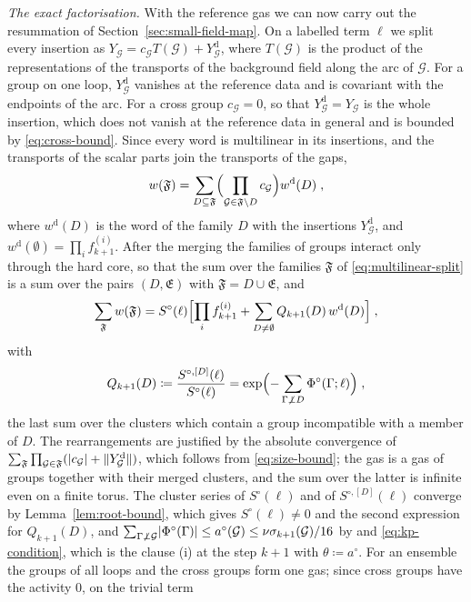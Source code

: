 \documentclass[11pt]{preprint}
\DeclarePairedDelimiter{\abs}{\lvert}{\rvert}
\DeclarePairedDelimiter{\norm}{\lVert}{\rVert}
\numberwithin{equation}{section}
\theoremstyle{definition}
\theoremstyle{remark}
\theoremstyle{plain}
\begin{document}
\emph{The exact factorisation.} With the reference gas we can now carry out the resummation of Section~\ref{sec:small-field-map}. On a labelled term $\ell$ we split every insertion as $Y_{\mathcal G} = c_{\mathcal G}T(\mathcal G) + Y^{\mathrm d}_{\mathcal G}$, where $T(\mathcal G)$ is the product of the representations of the transports of the background field along the arc of $\mathcal G$. For a group on one loop, $Y^{\mathrm d}_{\mathcal G}$ vanishes at the reference data and is covariant with the endpoints of the arc. For a cross group $c_{\mathcal G} = 0$, so that $Y^{\mathrm d}_{\mathcal G} = Y_{\mathcal G}$ is the whole insertion, which does not vanish at the reference data in general and is bounded by \eqref{eq:cross-bound}. Since every word is multilinear in its insertions, and the transports of the scalar parts join the transports of the gaps,
\begin{equation}\label{eq:multilinear-split}
    w(\mathfrak F) = \sum_{D \subseteq \mathfrak F}\Bigl(\prod_{\mathcal G \in \mathfrak F \setminus D}c_{\mathcal G}\Bigr)w^{\mathrm d}(D)\;,
\end{equation}
where $w^{\mathrm d}(D)$ is the word of the family $D$ with the insertions $Y^{\mathrm d}_{\mathcal G}$, and $w^{\mathrm d}(\emptyset) = \prod_if^{(i)}_{k+1}$. After the merging the families of groups interact only through the hard core, so that the sum over the families $\mathfrak F$ of \eqref{eq:multilinear-split} is a sum over the pairs $(D, \mathfrak E)$ with $\mathfrak F = D \cup \mathfrak E$, and
\begin{equation}\label{eq:exact-factorisation}
    \sum_{\mathfrak F}w(\mathfrak F) = S^\circ(\ell)\Bigl[\prod_if^{(i)}_{k+1} + \sum_{D \neq \emptyset}Q_{k+1}(D)\,w^{\mathrm d}(D)\Bigr]\;,
\end{equation}
with
\begin{equation}\label{eq:interaction-ratio}
    Q_{k+1}(D) \coloneqq \frac{S^{\circ,[D]}(\ell)}{S^\circ(\ell)} = \exp\Bigl(-\sum_{\Gamma \not\perp D}\Phi^\circ(\Gamma; \ell)\Bigr)\;,
\end{equation}
the last sum over the clusters which contain a group incompatible with a member of $D$. The rearrangements are justified by the absolute convergence of $\sum_{\mathfrak F}\prod_{\mathcal G \in \mathfrak F}(\abs{c_{\mathcal G}} + \norm{Y^{\mathrm d}_{\mathcal G}})$, which follows from \eqref{eq:size-bound}; the gas is a gas of groups together with their merged clusters, and the sum over the latter is infinite even on a finite torus. The cluster series of $S^\circ(\ell)$ and of $S^{\circ,[D]}(\ell)$ converge by Lemma~\ref{lem:root-bound}, which gives $S^\circ(\ell) \neq 0$ and the second expression for $Q_{k+1}(D)$, and $\sum_{\Gamma \not\perp \mathcal G}\abs{\Phi^\circ(\Gamma)} \leq a^\circ(\mathcal G) \leq \nu\sigma_{k+1}(\mathcal G)/16$ by \cite[Theorem~5.4]{FriedliVelenik} and \eqref{eq:kp-condition}, which is the clause (i) at the step $k + 1$ with $\theta \coloneqq a^\circ$. For an ensemble the groups of all loops and the cross groups form one gas; since cross groups have the activity $0$, on the trivial term
\end{document}
